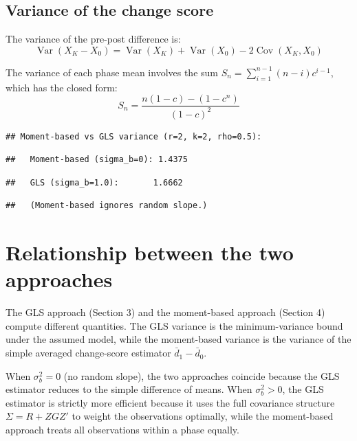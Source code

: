 \documentclass[
  11pt,
]{article}
\begin{document}
\subsection{Variance of the change
score}\label{variance-of-the-change-score}

The variance of the pre-post difference is: \begin{equation}
  \mathop{\mathrm{Var}}(X_K - X_0) = \mathop{\mathrm{Var}}(X_K) + \mathop{\mathrm{Var}}(X_0)
    - 2\mathop{\mathrm{Cov}}(X_K, X_0)
\end{equation}

The variance of each phase mean involves the sum
\(S_n = \sum_{i=1}^{n-1}(n-i)c^{i-1}\), which has the closed form:
\begin{equation}
  S_n = \frac{n(1-c) - (1-c^n)}{(1-c)^2}
\end{equation}

\begin{verbatim}
## Moment-based vs GLS variance (r=2, k=2, rho=0.5):
\end{verbatim}

\begin{verbatim}
##   Moment-based (sigma_b=0): 1.4375
\end{verbatim}

\begin{verbatim}
##   GLS (sigma_b=1.0):       1.6662
\end{verbatim}

\begin{verbatim}
##   (Moment-based ignores random slope.)
\end{verbatim}

\section{Relationship between the two
approaches}\label{relationship-between-the-two-approaches}

The GLS approach (Section 3) and the moment-based approach (Section 4)
compute different quantities. The GLS variance is the minimum-variance
bound under the assumed model, while the moment-based variance is the
variance of the simple averaged change-score estimator
\(\bar{d}_1 - \bar{d}_0\).

When \(\sigma_b^2 = 0\) (no random slope), the two approaches coincide
because the GLS estimator reduces to the simple difference of means.
When \(\sigma_b^2 > 0\), the GLS estimator is strictly more efficient
because it uses the full covariance structure \(\Sigma = R + ZGZ'\) to
weight the observations optimally, while the moment-based approach
treats all observations within a phase equally.
\end{document}
